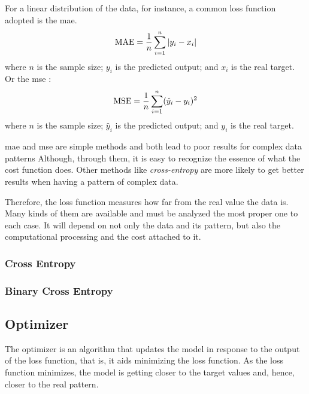 For a linear distribution of the data, for instance, a common loss function adopted is the \gls*{mae}.
%
\begin{equation}
    \text{MAE} = \frac{1}{n} \sum_{i=1}^n |y_i - x_i|
    \label{eq:mae}
\end{equation}
%
where \(n\) is the sample size; \(y_i\) is the predicted output; and \(x_i\) is the real target. Or the \gls*{mse} \cite{bussab2017}:
%
\begin{equation}
    \text{MSE} = \frac{1}{n} \sum_{i=1}^n (\hat{y}_i - y_i)^2
    \label{eq:mse}
\end{equation}
%
where \(n\) is the sample size; \(\hat{y}_i\) is the predicted output; and \(y_i\) is the real target.

\gls*{mae} and \gls*{mse} are simple methods and both lead to poor results for complex data patterns
Although, through them, it is easy to recognize the essence of what the cost function does. 
Other methods like \emph{cross-entropy} are more likely to get better results when having a pattern of complex data.

Therefore, the loss function measures how far from the real value the data is. Many kinds of them are available and must be analyzed the most proper one to each case. 
It will depend on not only the data and its pattern, but also the computational processing and the cost attached to it.

\subsubsection*{Cross Entropy}

\subsubsection*{Binary Cross Entropy}

\subsection{Optimizer}

The optimizer is an algorithm that updates the model in response to the output of the loss function, that is, it aids minimizing the loss function. 
As the loss function minimizes, the model is getting closer to the target values and, hence, closer to the real pattern.

